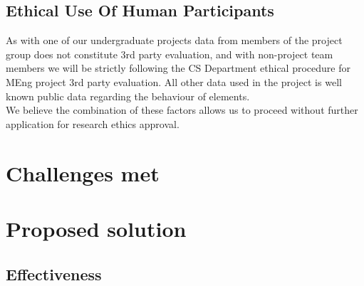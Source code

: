 \subsection{Ethical Use Of Human Participants}
As with one of our undergraduate projects data from members of the project group does not constitute 3rd party evaluation, and with non-project team members we will be strictly following the CS Department ethical procedure for MEng project 3rd party evaluation. All other data used in the project is well known public data regarding the behaviour of elements. \\

We believe the combination of these factors allows us to proceed without further application for research ethics approval.

\section{Challenges met}

\section{Proposed solution}
\subsection{Effectiveness}

